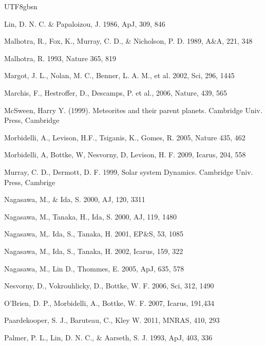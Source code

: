 \documentclass[tighten]{aastex6}
\begin{document}
\begin{CJK*}{UTF8}{gbsn}
\begin{thebibliography}{}
 Lin, D. N. C. \& Papaloizou, J. 1986, ApJ, 309, 846


 Malhotra, R., Fox, K., Murray, C. D., \& Nicholson, P. D. 1989, A\&A, 221, 348

 Malhotra, R. 1993, Nature 365, 819

 Margot, J. L., Nolan, M. C., Benner, L. A. M., et al. 2002, Sci, 296, 1445

 Marchis, F., Hestroffer, D., Descamps, P. et al., 2006, Nature, 439, 565

 McSween, Harry Y. (1999). Meteorites and their parent planets. Cambridge Univ. Press, Cambridge

 Morbidelli, A., Levison, H.F., Tsiganis, K., Gomes, R. 2005, Nature 435, 462

 Morbidelli, A, Bottke, 
W, Nesvorny, D, Levison, H. F. 2009, Icarus, 204, 558

 Murray, C. D., Dermott, D. F. 1999, Solar system Dynamics. Cambridge Univ. Press, Cambrige

 Nagasawa, M., \& Ida, S. 
2000, AJ, 120, 3311

 Nagasawa, M., Tanaka, H., Ida, S. 2000, AJ, 119, 1480

 Nagasawa, M,. Ida, S., Tanaka, H. 2001, EP\&S, 53, 1085  

 Nagasawa, M., Ida, S., Tanaka, H. 2002, Icarus, 159, 322

 Nagasawa, M., Lin D., 
Thommes, E. 2005, ApJ, 635, 578


 Nesvorny, D., Vokrouhlicky, D., Bottke, W. F. 2006, Sci, 312, 1490


 O'Brien, D. P., Morbidelli, A., Bottke, W. F. 2007, Icarus, 191,434

 Paardekooper, S. J., Baruteau, C., Kley W. 2011, MNRAS, 410, 293

 Palmer, P. L., Lin, D. N. C., \& Aarseth, S. J. 1993, ApJ, 403, 336


\end{thebibliography}
\end{CJK*}
\end{document}
